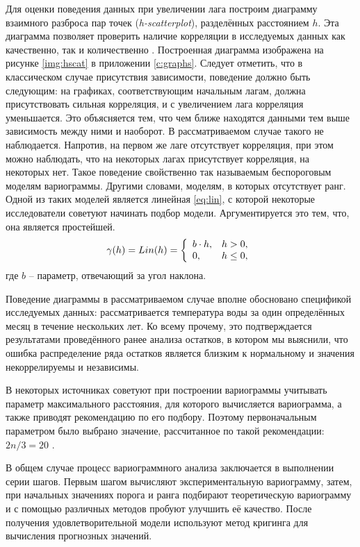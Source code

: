 Для оценки поведения данных при увеличении лага построим диаграмму взаимного разброса пар точек (\textit{h-scatterplot}), разделённых расстоянием $ h $. Эта диаграмма позволяет проверить наличие корреляции в исследуемых данных как качественно, так и количественно \cite{saveliev2012}. Построенная диаграмма изображена на рисунке \ref{img:hscat} в приложении \ref{c:graphs}. Следует отметить, что в классическом случае присутствия зависимости, поведение должно быть следующим: на графиках, соответствующим начальным лагам, должна присутствовать сильная корреляция, и с увеличением лага корреляция уменьшается. Это объясняется тем, что чем ближе находятся данными тем выше зависимость между ними и наоборот. В рассматриваемом случае такого не наблюдается. Напротив, на первом же лаге отсутствует корреляция, при этом можно наблюдать, что на некоторых лагах присутствует корреляция, на некоторых нет. Такое поведение свойственно так называемым беспороговым моделям вариограммы. Другими словами, моделям, в которых отсутствует ранг. Одной из таких моделей является линейная \eqref{eq:lin}, с которой некоторые исследователи советуют начинать подбор модели. Аргументируется это тем, что, она является простейшей.
\begin{equation}
\label{eq:lin}
	\gamma(h) = Lin(h) = \left\{
 \begin{array}{l l}
   b \cdot h, & h > 0, \\
   0, & h \leq 0,
 \end{array} \right.
\end{equation}
где $ b $ -- параметр, отвечающий за угол наклона.

Поведение диаграммы в рассматриваемом случае вполне обосновано спецификой исследуемых данных: рассматривается температура воды за один определённых месяц в течение нескольких лет. Ко всему прочему, это подтверждается результатами проведённого ранее анализа остатков, в котором мы выяснили, что ошибка распределение ряда остатков является близким к нормальному и значения некоррелируемы и независимы.

В некоторых источниках советуют при построении вариограммы учитывать параметр максимального расстояния, для которого вычисляется вариограмма, а также приводят рекомендацию по его подбору. Поэтому первоначальным параметром было выбрано значение, рассчитанное по такой рекомендации: $ 2n / 3 = 20 $ \cite{cressie2011statistics}.

В общем случае процесс вариограммного анализа заключается в выполнении серии шагов. Первым шагом вычисляют экспериментальную вариограмму, затем, при начальных значениях порога и ранга подбирают теоретическую вариограмму и с помощью различных методов пробуют улучшить её качество. После получения удовлетворительной модели используют метод кригинга для вычисления прогнозных значений.

